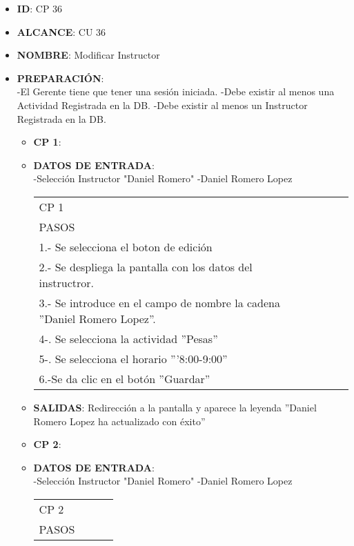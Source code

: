 \begin{itemize}
\item \textbf{ID}: CP 36
\item \textbf{ALCANCE}: CU 36
\item \textbf{NOMBRE}: Modificar Instructor
\item \textbf{PREPARACIÓN}:\\
		-El Gerente tiene que tener una sesión iniciada.
		-Debe existir al menos una Actividad Registrada en la DB.
		-Debe existir al menos un Instructor Registrada en la DB.
\begin{itemize}
\item \textbf{CP 1}:
\item \textbf{DATOS DE ENTRADA}:\\
-Selección Instructor "Daniel Romero"
-Daniel Romero Lopez
	\begin{center}			
	\begin{tabular}{||l|l|l|l||}
		\hline
		\hline
			CP 1\\
			PASOS\\
			\hline 1.- Se selecciona el boton de edición\\
			\hline 2.- Se despliega la pantalla con los datos del instructror.\\
			\hline 3.- Se introduce en el campo de nombre la cadena ''Daniel Romero Lopez''.\\
			\hline 4-. Se selecciona la actividad ''Pesas''\\
			\hline 5-. Se selecciona el horario '''8:00-9:00''\\
            \hline 6.-Se da clic en el botón ''Guardar''\\
        \hline
		\hline
	\end{tabular}
	\end{center}
\item \textbf{SALIDAS}: Redirección a la pantalla  y aparece la leyenda ''Daniel Romero Lopez ha actualizado con éxito''
\end{itemize}
\begin{itemize}
\item \textbf{CP 2}:
\item \textbf{DATOS DE ENTRADA}:\\
-Selección Instructor "Daniel Romero"
-Daniel Romero Lopez
	\begin{center}			
	\begin{tabular}{||l|l|l|l||}
		\hline
		\hline
			CP 2\\
			PASOS\\

\end{tabular}
\end{center}
\end{itemize}
\end{itemize}
